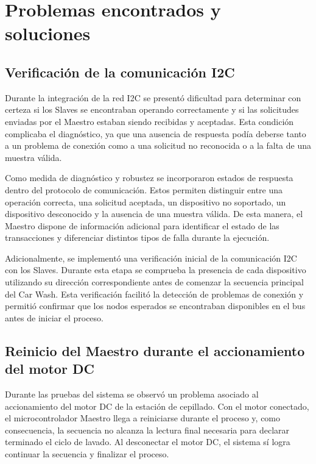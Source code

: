 \section{Problemas encontrados y soluciones}

\subsection{Verificación de la comunicación I2C}

Durante la integración de la red I2C se presentó dificultad para determinar con certeza si los Slaves se encontraban operando correctamente y si las solicitudes enviadas por el Maestro estaban siendo recibidas y aceptadas. Esta condición complicaba el diagnóstico, ya que una ausencia de respuesta podía deberse tanto a un problema de conexión como a una solicitud no reconocida o a la falta de una muestra válida.

Como medida de diagnóstico y robustez se incorporaron estados de respuesta dentro del protocolo de comunicación. Estos permiten distinguir entre una operación correcta, una solicitud aceptada, un dispositivo no soportado, un dispositivo desconocido y la ausencia de una muestra válida. De esta manera, el Maestro dispone de información adicional para identificar el estado de las transacciones y diferenciar distintos tipos de falla durante la ejecución.

Adicionalmente, se implementó una verificación inicial de la comunicación I2C con los Slaves. Durante esta etapa se comprueba la presencia de cada dispositivo utilizando su dirección correspondiente antes de comenzar la secuencia principal del Car Wash. Esta verificación facilitó la detección de problemas de conexión y permitió confirmar que los nodos esperados se encontraban disponibles en el bus antes de iniciar el proceso.

\subsection{Reinicio del Maestro durante el accionamiento del motor DC}

Durante las pruebas del sistema se observó un problema asociado al accionamiento del motor DC de la estación de cepillado. Con el motor conectado, el microcontrolador Maestro llega a reiniciarse durante el proceso y, como consecuencia, la secuencia no alcanza la lectura final necesaria para declarar terminado el ciclo de lavado. Al desconectar el motor DC, el sistema sí logra continuar la secuencia y finalizar el proceso.

